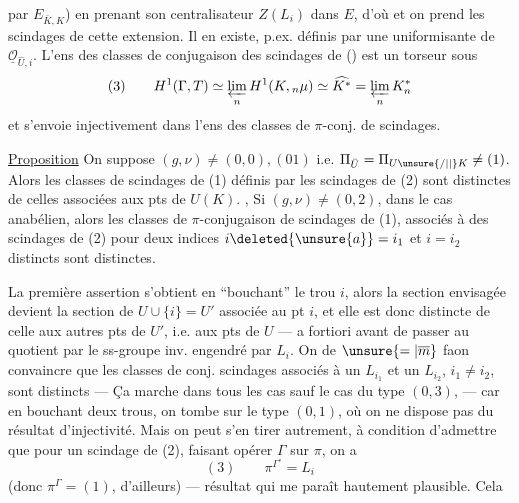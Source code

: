 
par $E_{\bar K,K}$) en prenant son centralisateur $Z(L_i)$ dans $E$, d'où
et on prend les scindages de cette extension. Il en existe, p.ex. définis par une uniformisante de $\underline{\mathcal O}_{\widehat U,i}$. L'ens des classes de conjugaison des  scindages  de () est un torseur sous 
\[
(3)\qquad H^1(\Gamma,T)\simeq\varprojlim_n H^1(K,{}_n\mu)\simeq\widehat{K^*}=\varprojlim_n K^*_n
\]
et  s'envoie injectivement  dans l'ens des classes de $\pi$-conj. de scindages.

\uline{Proposition} On suppose $(g,\nu)\ne(0,0),(01)$ i.e. $\Pi_{\bar U}=\Pi_{U\unsure{/|\mid}K}\ne(1)$. Alors les classes de  scindages  de (1) définis par les scindages de (2) sont distinctes de celles associées aux pts de $U(K)$. , Si  $(g,\nu)\ne(0,2)$,   dans le cas anabélien, alors les classes de $\pi$-conjugaison de scindages de (1), associés à des scindages de (2) pour deux indices $i\deleted{\unsure{a}}=i_1$ et $i=i_2$ distincts\unsure{,} sont distinctes.

La première assertion s'obtient en ``bouchant''
le trou $i$, alors la section envisagée devient
la section de $U\cup\{i\}=U'$ associée au pt $i$,
et elle est donc distincte de celle 
aux  autres pts de $U'$, i.e. aux pts de
$U$ --- a fortiori avant de passer au
quotient par le ss-groupe inv. engendré
par $L_i$. On  de $\unsure{=|\overline m}$ faon 
convaincre que les classes de conj. 
scindages associés à un $L_{i_1}$ et un $L_{i_2}$, $i_1\ne i_2$,
sont distincts --- Ça marche dans tous les
cas sauf le cas du type $(0,3)$, ---
car en bouchant deux trous, on tombe
sur le type $(0,1)$, où on ne dispose pas
du résultat d'injectivité. Mais on
peut s'en tirer autrement, à condition
d'admettre que pour un scindage de
(2), faisant opérer $\Gamma$ sur $\pi$, on a
\[
(3)\qquad\pi^{\Gamma^\circ}=L_i
\]
(donc $\pi^\Gamma=(1)$, d'ailleurs) --- résultat
qui me paraît hautement plausible. Cela

